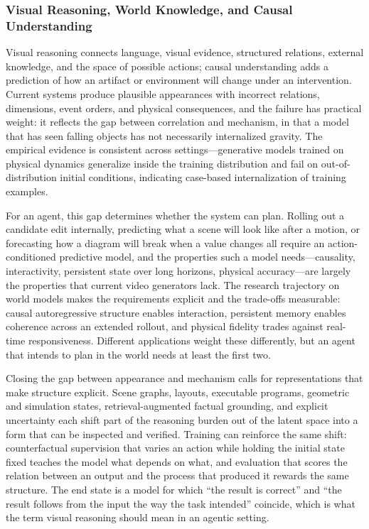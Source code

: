 \subsubsection{Visual Reasoning, World Knowledge, and Causal Understanding}

Visual reasoning connects language, visual evidence, structured relations, external knowledge, and the space of possible actions; causal understanding adds a prediction of how an artifact or environment will change under an intervention. Current systems produce plausible appearances with incorrect relations, dimensions, event orders, and physical consequences, and the failure has practical weight: it reflects the gap between correlation and mechanism, in that a model that has seen falling objects has not necessarily internalized gravity. The empirical evidence is consistent across settings---generative models trained on physical dynamics generalize inside the training distribution and fail on out-of-distribution initial conditions, indicating case-based internalization of training examples.

For an agent, this gap determines whether the system can plan. Rolling out a candidate edit internally, predicting what a scene will look like after a motion, or forecasting how a diagram will break when a value changes all require an action-conditioned predictive model, and the properties such a model needs---causality, interactivity, persistent state over long horizons, physical accuracy---are largely the properties that current video generators lack. The research trajectory on world models makes the requirements explicit and the trade-offs measurable: causal autoregressive structure enables interaction, persistent memory enables coherence across an extended rollout, and physical fidelity trades against real-time responsiveness. Different applications weight these differently, but an agent that intends to plan in the world needs at least the first two.

Closing the gap between appearance and mechanism calls for representations that make structure explicit. Scene graphs, layouts, executable programs, geometric and simulation states, retrieval-augmented factual grounding, and explicit uncertainty each shift part of the reasoning burden out of the latent space into a form that can be inspected and verified. Training can reinforce the same shift: counterfactual supervision that varies an action while holding the initial state fixed teaches the model what depends on what, and evaluation that scores the relation between an output and the process that produced it rewards the same structure. The end state is a model for which ``the result is correct'' and ``the result follows from the input the way the task intended'' coincide, which is what the term visual reasoning should mean in an agentic setting.

